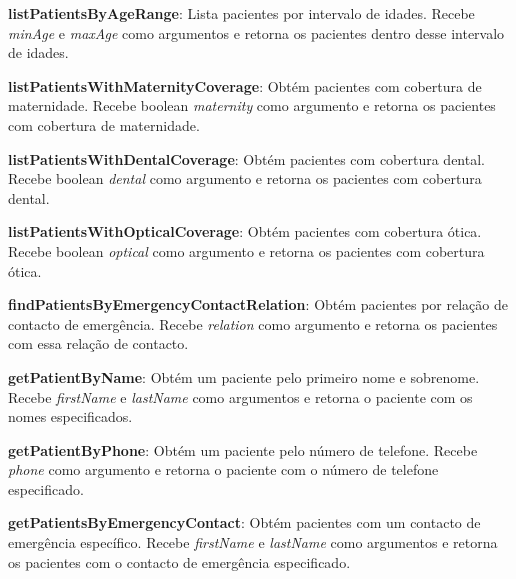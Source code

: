 \vspace{0.15cm}

\textbf{listPatientsByAgeRange}: Lista pacientes por intervalo de idades. Recebe \textit{minAge} e \textit{maxAge} como argumentos e retorna os pacientes dentro desse intervalo de idades.

\vspace{0.15cm}

\textbf{listPatientsWithMaternityCoverage}: Obtém pacientes com cobertura de maternidade. Recebe boolean \textit{maternity} como argumento e retorna os pacientes com cobertura de maternidade.

\vspace{0.15cm}

\textbf{listPatientsWithDentalCoverage}: Obtém pacientes com cobertura dental. Recebe boolean \textit{dental} como argumento e retorna os pacientes com cobertura dental.

\vspace{0.15cm}

\textbf{listPatientsWithOpticalCoverage}: Obtém pacientes com cobertura ótica. Recebe boolean \textit{optical} como argumento e retorna os pacientes com cobertura ótica.

\vspace{0.15cm}

\textbf{findPatientsByEmergencyContactRelation}: Obtém pacientes por relação de contacto de emergência. Recebe \textit{relation} como argumento e retorna os pacientes com essa relação de contacto.

\vspace{0.15cm}

\textbf{getPatientByName}: Obtém um paciente pelo primeiro nome e sobrenome. Recebe \textit{firstName} e \textit{lastName} como argumentos e retorna o paciente com os nomes especificados.

\vspace{0.15cm}

\textbf{getPatientByPhone}: Obtém um paciente pelo número de telefone. Recebe \textit{phone} como argumento e retorna o paciente com o número de telefone especificado.

\vspace{0.15cm}

\textbf{getPatientsByEmergencyContact}: Obtém pacientes com um contacto de emergência específico. Recebe \textit{firstName} e \textit{lastName} como argumentos e retorna os pacientes com o contacto de emergência especificado.

